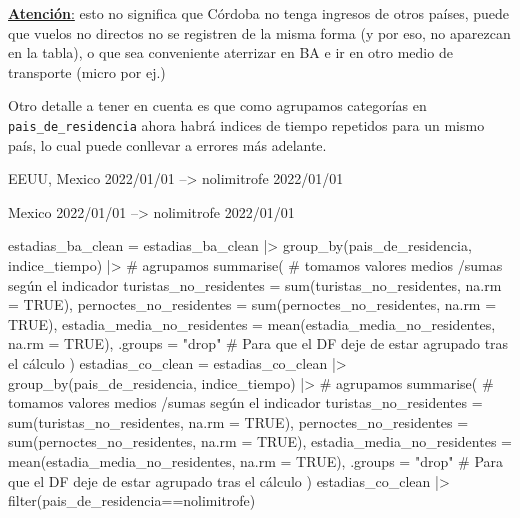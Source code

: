 \documentclass[
  spanish,
  letterpaper,
  DIV=11,
  numbers=noendperiod]{scrartcl}
\newenvironment{Shaded}{\begin{snugshade}}{\end{snugshade}}
\newcommand{\AttributeTok}[1]{\textcolor[rgb]{0.40,0.45,0.13}{#1}}
\newcommand{\CommentTok}[1]{\textcolor[rgb]{0.37,0.37,0.37}{#1}}
\newcommand{\ConstantTok}[1]{\textcolor[rgb]{0.56,0.35,0.01}{#1}}
\newcommand{\FunctionTok}[1]{\textcolor[rgb]{0.28,0.35,0.67}{#1}}
\newcommand{\NormalTok}[1]{\textcolor[rgb]{0.00,0.23,0.31}{#1}}
\newcommand{\OtherTok}[1]{\textcolor[rgb]{0.00,0.23,0.31}{#1}}
\newcommand{\SpecialCharTok}[1]{\textcolor[rgb]{0.37,0.37,0.37}{#1}}
\newcommand{\StringTok}[1]{\textcolor[rgb]{0.13,0.47,0.30}{#1}}
\begin{document}
\ul{\textbf{Atención}:} esto no significa que Córdoba no tenga ingresos
de otros países, puede que vuelos no directos no se registren de la
misma forma (y por eso, no aparezcan en la tabla), o que sea conveniente
aterrizar en BA e ir en otro medio de transporte (micro por ej.)

Otro detalle a tener en cuenta es que como agrupamos categorías en
\texttt{pais\_de\_residencia} ahora habrá indices de tiempo repetidos
para un mismo país, lo cual puede conllevar a errores más adelante.

EEUU, Mexico 2022/01/01 --\textgreater{} nolimitrofe 2022/01/01

Mexico 2022/01/01 --\textgreater{} nolimitrofe 2022/01/01

\begin{Shaded}
\begin{Highlighting}[]
\NormalTok{estadias\_ba\_clean }\OtherTok{=}\NormalTok{ estadias\_ba\_clean }\SpecialCharTok{|\textgreater{}} 
  \FunctionTok{group\_by}\NormalTok{(pais\_de\_residencia, indice\_tiempo) }\SpecialCharTok{|\textgreater{}} \CommentTok{\# agrupamos}
    \FunctionTok{summarise}\NormalTok{( }\CommentTok{\# tomamos valores medios /sumas según el indicador}
      \AttributeTok{turistas\_no\_residentes =} \FunctionTok{sum}\NormalTok{(turistas\_no\_residentes, }\AttributeTok{na.rm =} \ConstantTok{TRUE}\NormalTok{),}
      \AttributeTok{pernoctes\_no\_residentes =} \FunctionTok{sum}\NormalTok{(pernoctes\_no\_residentes, }\AttributeTok{na.rm =} \ConstantTok{TRUE}\NormalTok{),}
      \AttributeTok{estadia\_media\_no\_residentes =} \FunctionTok{mean}\NormalTok{(estadia\_media\_no\_residentes, }\AttributeTok{na.rm =} \ConstantTok{TRUE}\NormalTok{),}
      \AttributeTok{.groups =} \StringTok{"drop"} \CommentTok{\# Para que el DF deje de estar agrupado tras el cálculo}
\NormalTok{    )}
\NormalTok{estadias\_co\_clean }\OtherTok{=}\NormalTok{ estadias\_co\_clean }\SpecialCharTok{|\textgreater{}} 
  \FunctionTok{group\_by}\NormalTok{(pais\_de\_residencia, indice\_tiempo) }\SpecialCharTok{|\textgreater{}} \CommentTok{\# agrupamos}
    \FunctionTok{summarise}\NormalTok{( }\CommentTok{\# tomamos valores medios /sumas según el indicador}
      \AttributeTok{turistas\_no\_residentes =} \FunctionTok{sum}\NormalTok{(turistas\_no\_residentes, }\AttributeTok{na.rm =} \ConstantTok{TRUE}\NormalTok{),}
      \AttributeTok{pernoctes\_no\_residentes =} \FunctionTok{sum}\NormalTok{(pernoctes\_no\_residentes, }\AttributeTok{na.rm =} \ConstantTok{TRUE}\NormalTok{),}
      \AttributeTok{estadia\_media\_no\_residentes =} \FunctionTok{mean}\NormalTok{(estadia\_media\_no\_residentes, }\AttributeTok{na.rm =} \ConstantTok{TRUE}\NormalTok{),}
      \AttributeTok{.groups =} \StringTok{"drop"} \CommentTok{\# Para que el DF deje de estar agrupado tras el cálculo}
\NormalTok{    )}
\NormalTok{estadias\_co\_clean }\SpecialCharTok{|\textgreater{}} \FunctionTok{filter}\NormalTok{(pais\_de\_residencia}\SpecialCharTok{==}\StringTok{\textquotesingle{}nolimitrofe\textquotesingle{}}\NormalTok{)}
\end{Highlighting}
\end{Shaded}
\end{document}
